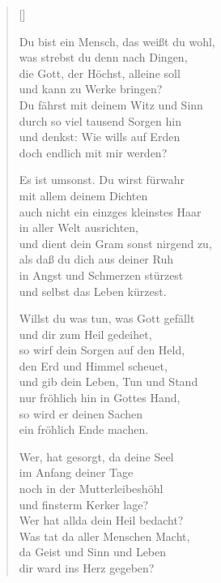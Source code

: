 \begin{multicols}{2}
\settowidth{\versewidth}{Du bist ein Mensch, das weißt du wohl,}
\begin{verse}[\versewidth]

 Du bist ein Mensch, das weißt du wohl,\\
was strebst du denn nach Dingen,\\
die Gott, der Höchst, alleine soll\\
und kann zu Werke bringen?\\
Du fährst mit deinem Witz und Sinn\\
durch so viel tausend Sorgen hin\\
und denkst: Wie wills auf Erden\\
doch endlich mit mir werden?

 Es ist umsonst. Du wirst fürwahr\\
mit allem deinem Dichten\\
auch nicht ein einzges kleinstes Haar\\
in aller Welt ausrichten,\\
und dient dein Gram sonst nirgend zu,\\
als daß du dich aus deiner Ruh\\
in Angst und Schmerzen stürzest\\
und selbst das Leben kürzest.

 Willst du was tun, was Gott gefällt\\
und dir zum Heil gedeihet,\\
so wirf dein Sorgen auf den Held,\\
den Erd und Himmel scheuet,\\
und gib dein Leben, Tun und Stand\\
nur fröhlich hin in Gottes Hand,\\
so wird er deinen Sachen\\
ein fröhlich Ende machen.

 Wer, hat gesorgt, da deine Seel\\
im Anfang deiner Tage\\
noch in der Mutterleibeshöhl\\
und finsterm Kerker lage?\\
Wer hat allda dein Heil bedacht?\\
Was tat da aller Menschen Macht,\\
da Geist und Sinn und Leben\\
dir ward ins Herz gegeben?


\end{verse}
\end{multicols}
